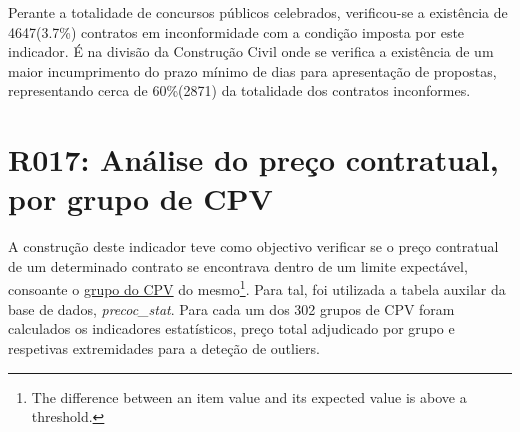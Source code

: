 Perante a totalidade de concursos públicos celebrados, verificou-se a existência de 4647(3.7\%) contratos em inconformidade com a condição imposta por este indicador. É na divisão da Construção Civil onde se verifica a existência de um maior incumprimento do prazo mínimo de dias para apresentação de propostas, representando cerca de 60\%(2871) da totalidade dos contratos inconformes. 











\section{R017: Análise do preço contratual, por grupo de CPV}


A construção deste indicador teve como objectivo verificar se o preço contratual de um determinado contrato se encontrava dentro de um limite expectável, consoante o \hyperref[sec:cepeves]{grupo do CPV} do mesmo\footnote{The difference between an item value and its expected value is above a threshold.}. Para tal, foi utilizada a tabela auxilar da base de dados, \textit{precoc\_stat}. Para cada um dos 302 grupos de CPV foram calculados os indicadores estatísticos, preço total adjudicado por grupo e respetivas extremidades para a deteção de outliers.


\begin{table}[H]
	\centering
	\renewcommand{\arraystretch}{1.4}
	\caption{Exemplo de uma linha da tabela \textit{precoc\_stat} para concursos públicos referentes alimentos para animais.}
	\label{tab:precocstat}	
\end{table}




